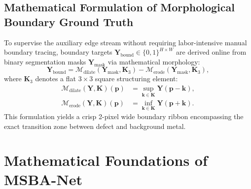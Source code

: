 \documentclass{ieeeaccess}
\begin{document}
\subsection{Mathematical Formulation of Morphological Boundary Ground Truth}
To supervise the auxiliary edge stream without requiring labor-intensive manual boundary tracing, boundary targets $\mathbf{Y}_{\text{bound}} \in \{0, 1\}^{H \times W}$ are derived online from binary segmentation masks $\mathbf{Y}_{\text{mask}}$ via mathematical morphology:
\begin{equation}
  \mathbf{Y}_{\text{bound}} = \mathcal{M}_{\text{dilate}}(\mathbf{Y}_{\text{mask}}, \mathbf{K}_3) - \mathcal{M}_{\text{erode}}(\mathbf{Y}_{\text{mask}}, \mathbf{K}_3),
  \label{eq:morph_boundary}
\end{equation}
where $\mathbf{K}_3$ denotes a flat $3 \times 3$ square structuring element:
\begin{align}
  \mathcal{M}_{\text{dilate}}(\mathbf{Y}, \mathbf{K})(\mathbf{p}) &= \sup_{\mathbf{k} \in \mathbf{K}} \mathbf{Y}(\mathbf{p} - \mathbf{k}), \\
  \mathcal{M}_{\text{erode}}(\mathbf{Y}, \mathbf{K})(\mathbf{p}) &= \inf_{\mathbf{k} \in \mathbf{K}} \mathbf{Y}(\mathbf{p} + \mathbf{k}).
\end{align}
This formulation yields a crisp 2-pixel wide boundary ribbon encompassing the exact transition zone between defect and background metal.

\section{Mathematical Foundations of MSBA-Net}
\label{sec:math_foundations}
\end{document}
